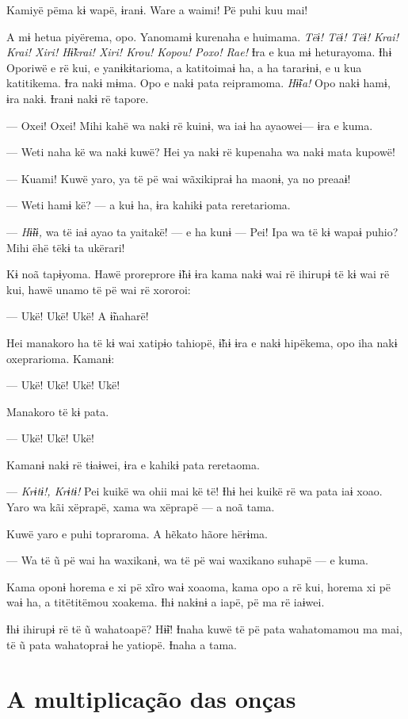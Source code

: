 Kamiyë pëma kɨ wapë, ɨranɨ. Ware a waimi! Pë puhi kuu mai!

A mɨ hetua piyërema, opo. Yanomamɨ kurenaha e huimama. \textit{Tëɨ! Tëɨ! Tëɨ!
Krai! Krai! Xiri! Hɨ̃krai! Xiri! Krou! Kopou! Poxo! Rae!} Ɨra e kua mɨ
heturayoma. Ɨhɨ Oporiwë e rë kui, e yanɨkɨtarioma, a katitoimaɨ ha, a ha
tararɨnɨ, e u kua katitikema. Ɨra nakɨ mɨma. Opo e nakɨ pata reipramoma.
\textit{Hɨ̃ɨa! }Opo nakɨ hamɨ, ɨra nakɨ. Ɨranɨ nakɨ rë tapore. 

--- Oxei! Oxei! Mihi kahë wa nakɨ rë kuinɨ, wa iaɨ ha ayaowei--- ɨra e
 kuma. 

--- Weti naha kë wa nakɨ kuwë? Hei ya nakɨ rë kupenaha wa nakɨ mata
kupowë! 

--- Kuami! Kuwë yaro, ya të pë wai wãxikipraɨ ha maonɨ, ya no preaaɨ! 

--- Weti hamɨ kë? --- a kuɨ ha, ɨra kahikɨ pata reretarioma.

--- \textit{Hɨ̃ɨɨ,} wa të iaɨ ayao ta yaitakë! --- e ha kunɨ --- Pei! Ipa wa të kɨ
wapaɨ puhio? Mihi ëhë tëkɨ ta ukërari! 

Kɨ noã tapɨyoma. Hawë proreprore ɨ̃hɨ ɨra kama nakɨ wai rë ihirupɨ të kɨ
wai rë kui, hawë unamo të pë wai rë xororoi: 

--- Ukë! Ukë! Ukë! A ɨ̃naharë! 

Hei manakoro ha të kɨ wai xatipɨo tahiopë, ɨ̃hɨ ɨra e nakɨ hipëkema, opo
iha nakɨ oxeprarioma. Kamanɨ: 

--- Ukë! Ukë! Ukë! Ukë! 

Manakoro të kɨ pata. 

--- Ukë! Ukë! Ukë! 

Kamanɨ nakɨ rë tɨaɨwei, ɨra e kahikɨ pata reretaoma. 

--- \textit{Krɨtɨ!, Krɨtɨ!} Pei kuikë wa ohii mai kë të! Ɨhɨ hei kuikë rë wa pata
 iaɨ xoao. Yaro wa kãi xëprapë, xama wa xëprapë --- a noã tama.

Kuwë yaro e puhi topraroma. A hẽkato hãore hërɨma. 

--- Wa të ũ pë wai ha waxikanɨ, wa të pë wai waxikano suhapë --- e
kuma. 

Kama oponɨ horema e xi pë xĩro waɨ xoaoma, kama opo a rë kui, horema xi
pë waɨ ha, a titëtitëmou xoakema. Ɨhɨ nakɨnɨ a iapë, pë ma rë iaɨwei. 

Ɨhɨ ihirupɨ rë të ũ wahatoapë? Hɨ̃ɨ! Ɨnaha kuwë të pë pata wahatomamou ma
 mai, të ũ pata wahatopraɨ he yatiopë. Ɨnaha a tama.
 
\chapter{A multiplicação das onças}

